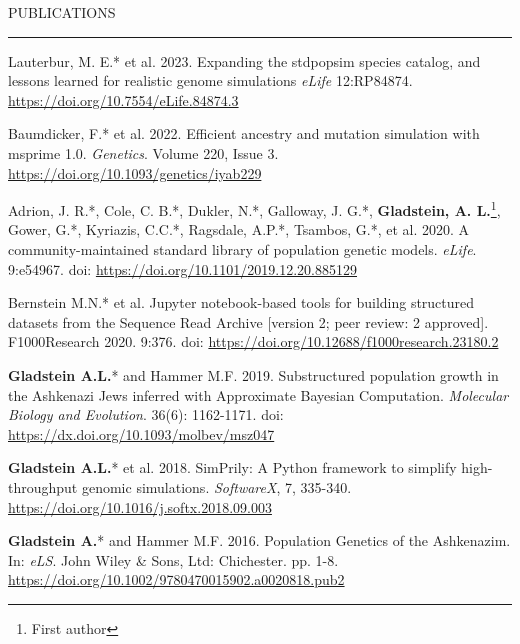 \documentclass{resume} %
\renewenvironment{rSection}[1]{
\sectionskip
\textcolor{RoyalPurple}{\MakeUppercase{#1}}
\sectionlineskip
\hrule
\begin{list}{}{
\setlength{\leftmargin}{1.5em}
}
\item[]
}{
\end{list}
}
\begin{document}
\newpage
\begin{rSection}{Publications}

\item Lauterbur, M. E.* et al. 2023. Expanding the stdpopsim species catalog, and lessons learned for realistic genome simulations \textit{eLife} 12:RP84874. \url{https://doi.org/10.7554/eLife.84874.3}

\item Baumdicker, F.* et al. 2022. Efficient ancestry and mutation simulation with msprime 1.0. \textit{Genetics}. Volume 220, Issue 3. \url{https://doi.org/10.1093/genetics/iyab229}

\item Adrion, J. R.*, Cole, C. B.*, Dukler, N.*, Galloway, J. G.*, \textbf{Gladstein, A. L.}\footnote{First author}, Gower, G.*, Kyriazis, C.C.*, Ragsdale, A.P.*, Tsambos, G.*, et al. 2020. A community-maintained standard library of population genetic models. \textit{eLife}. 9:e54967. doi: \url{https://doi.org/10.1101/2019.12.20.885129}

\item Bernstein M.N.* et al. Jupyter notebook-based tools for building structured datasets from the Sequence Read Archive [version 2; peer review: 2 approved]. F1000Research 2020. 9:376. doi: \url{https://doi.org/10.12688/f1000research.23180.2}

\item \textbf{Gladstein A.L.}* and Hammer M.F. 2019. Substructured population growth in the Ashkenazi Jews inferred with Approximate Bayesian Computation. \textit{Molecular Biology and Evolution}. 36(6): 1162-1171. doi: \url{https://dx.doi.org/10.1093/molbev/msz047}

\item \textbf{Gladstein A.L.}* et al. 2018. SimPrily: A Python framework to simplify high-throughput genomic simulations. \textit{SoftwareX}, 7, 335-340. \url{https://doi.org/10.1016/j.softx.2018.09.003}


\item \textbf{Gladstein A.}* and Hammer M.F. 2016. Population Genetics of the Ashkenazim. In: \textit{eLS}. John Wiley \& Sons, Ltd: Chichester. pp. 1-8. \url{https://doi.org/10.1002/9780470015902.a0020818.pub2}


\end{rSection}
\end{document}
